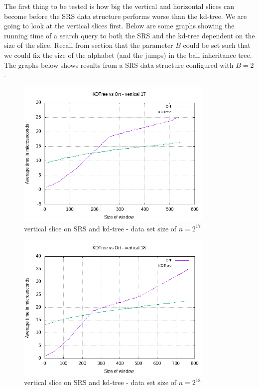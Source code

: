 The first thing to be tested is how big the vertical and horizontal slices can become before the SRS data structure performs worse than the kd-tree. We are going to look at the vertical slices first. Below are some graphs showing the running time of a search query to both the SRS and the kd-tree dependent on the size of the slice. Recall from section  that the parameter $B$ could be set such that we could fix the size of the alphabet (and the jumps) in the ball inheritance tree. The graphs below shows results from a SRS data structure configured with $B=2$. 


\begin{figure}[h]
    \centering
    \includegraphics[width = 0.85\textwidth]{pictures/analysis/vert_17.png}
    \caption{vertical slice on SRS and kd-tree - data set size of $n=2^{17}$}\label{fig:vert_17}
\end{figure}

\begin{figure}[h]
    \centering
    \includegraphics[width = 0.85\textwidth]{pictures/analysis/vert_18.png}
    \caption{vertical slice on SRS and kd-tree - data set size of $n=2^{18}$}\label{fig:vert_18}
\end{figure}

